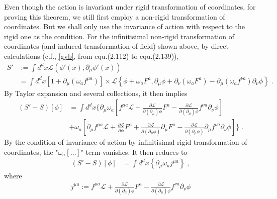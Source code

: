 \documentclass[]{article}
\begin{document}
\begin{roof}
  Even though the action is invariant under rigid transformation of coordinates, for proving this theorem, we still first employ a non-rigid transformation of coordinates. But we shall only use the invariance of action with respect to the rigid one as the condition.
  For the infinitisimal non-rigid transformation of coordinates (and induced transformation of field) shown above, by direct calculations (c.f., \ref{gyb}, from equ.(2.112) to equ.(2.139)),
  \begin{align}
    S' &
    := \int d^d x \mathscr{L} \left(\phi' (x), \partial_{\mu} \phi'(x) \right)
    \\
    & =
    \int d^d x \left[ 1 + \partial_{\mu} \left( \omega_a f^{\mu a} \right) \right] \times
      \mathscr{L} \left\{ \phi + \omega_a F^a, \partial_{\mu} \phi +
        \partial_{\nu} \left( \omega_a F^a \right) - \partial_{\mu} \left( \omega_a f^{\nu a} \right) \partial_{\nu} \phi \right\}
    \;.
  \end{align}
  By Taylor expansion and several collections, it then implies
  \begin{align}
    (S' - S) [\phi]
    & =
    \int d^d x \Bigg\{
      \partial_{\mu} \omega_a \left[
        f^{\mu a} \mathscr{L}
        + \frac{\partial \mathscr{L}}{\partial (\partial_{\mu}) \phi} F^a
        - \frac{\partial \mathscr{L}}{\partial (\partial_{\mu}) \phi} f^{\nu a} \partial_{\nu} \phi
        \right]
      \\
      &
      + \omega_a \left[
        \partial_{\mu} f^{\mu a} \mathscr{L}
        + \frac{\partial \mathcal{L}}{\partial \phi} F^a
        + \frac{\partial \mathscr{L}}{\partial (\partial_{\mu} \phi)} \partial_{\mu} F^a
        - \frac{\partial \mathscr{L}}{\partial (\partial_{\mu} \phi)} \partial_{\mu} f^{\nu a} \partial_{\nu} \phi
        \right]
      \Bigg\}
    \;.
  \end{align}
  By the condition of invariance of action by infinitisimal rigid transformation of coordinates, the "$\omega_a [\ldots]$" term vanishes. It then reduces to
  \begin{align}
    (S' - S) [\phi]
    & =
    \int d^d x \left\{
      \partial_{\mu} \omega_a j^{\mu a}
      \right\}
    \;,
  \end{align}
  where
  \begin{align}
    j^{\mu a} :=
      f^{\mu a} \mathscr{L}
      + \frac{\partial \mathscr{L}}{\partial (\partial_{\mu}) \phi} F^a
      - \frac{\partial \mathscr{L}}{\partial (\partial_{\mu}) \phi} f^{\nu a} \partial_{\nu} \phi

\end{align}
\end{roof}
\end{document}
